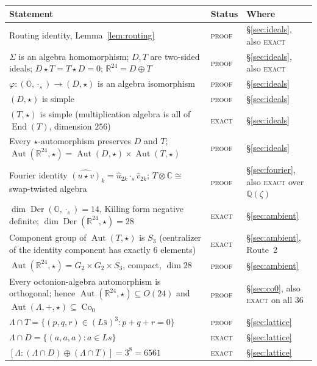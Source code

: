\documentclass[11pt]{amsart}
\newcommand{\LL}{\Lambda}
\newcommand{\OO}{\mathbb{O}}
\newcommand{\QQ}{\mathbb{Q}}
\newcommand{\RR}{\mathbb{R}}
\newcommand{\CC}{\mathbb{C}}
\DeclareMathOperator{\Aut}{Aut}
\DeclareMathOperator{\Der}{Der}
\DeclareMathOperator{\End}{End}
\DeclareMathOperator{\Co}{Co}
\theoremstyle{definition}
\theoremstyle{remark}
\begin{document}
\begin{center}
\small
\begin{longtable}{p{}p{}p{}}
\toprule
Statement & Status & Where \\
\midrule
\endhead
Routing identity, Lemma~\ref{lem:routing} & \textsc{proof} & \S\ref{sec:ideals}, also \textsc{exact} \\
$\Sigma$ is an algebra homomorphism; $D, T$ are two-sided ideals; $D \star T = T \star D = 0$; $\RR^{24} = D \oplus T$ & \textsc{proof} & \S\ref{sec:ideals}, also \textsc{exact} \\
$\varphi : (\OO,\cdot_s) \to (D,\star)$ is an algebra isomorphism & \textsc{proof} & \S\ref{sec:ideals} \\
$(D,\star)$ is simple & \textsc{proof} & \S\ref{sec:ideals} \\
$(T,\star)$ is simple (multiplication algebra is all of $\End(T)$, dimension $256$) & \textsc{exact} & \S\ref{sec:ideals} \\
Every $\star$-automorphism preserves $D$ and $T$; $\Aut(\RR^{24},\star) = \Aut(D,\star) \times \Aut(T,\star)$ & \textsc{proof} & \S\ref{sec:ideals} \\
Fourier identity $\widehat{(u\star v)}_k = \hat u_{2k} \cdot_s \hat v_{2k}$; $T \otimes \CC \cong$ swap-twisted algebra & \textsc{proof} & \S\ref{sec:fourier}, also \textsc{exact} over $\QQ(\zeta)$ \\
$\dim \Der(\OO,\cdot_s) = 14$, Killing form negative definite; $\dim \Der(\RR^{24},\star) = 28$ & \textsc{exact} & \S\ref{sec:ambient} \\
Component group of $\Aut(T,\star)$ is $S_3$ (centralizer of the identity component has exactly $6$ elements) & \textsc{exact} & \S\ref{sec:ambient}, Route~2 \\
$\Aut(\RR^{24},\star) = G_2 \times G_2 \times S_3$, compact, $\dim 28$ & \textsc{proof} & \S\ref{sec:ambient} \\
Every octonion-algebra automorphism is orthogonal; hence $\Aut(\RR^{24},\star) \subseteq O(24)$ and $\Aut(\LL,+,\star) \subseteq \Co_0$ & \textsc{proof} & \S\ref{sec:co0}, also \textsc{exact} on all $36$ \\
$\LL \cap T = \{(p,q,r) \in (L\bar s)^3 : p+q+r=0\}$ & \textsc{proof} & \S\ref{sec:lattice} \\
$\LL \cap D = \{(a,a,a) : a \in Ls\}$ & \textsc{exact} & \S\ref{sec:lattice} \\
$[\LL : (\LL \cap D) \oplus (\LL \cap T)] = 3^8 = 6561$ & \textsc{exact} & \S\ref{sec:lattice} \\

\end{longtable}
\end{center}
\end{document}
